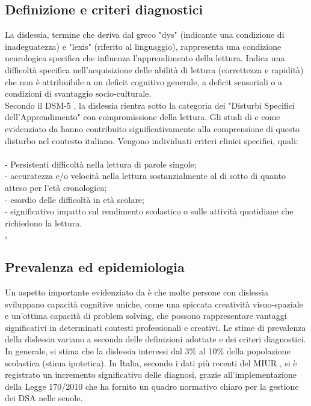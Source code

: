 \documentclass[14pt]{extbook}
\begin{document}
\subsection{Definizione e criteri diagnostici}
La dislessia, termine che deriva dal greco "dys" (indicante una condizione di inadeguatezza) e "lexis" (riferito al linguaggio), rappresenta una condizione neurologica specifica che influenza l'apprendimento della lettura. Indica una difficoltà specifica nell’acquisizione delle abilità di lettura (correttezza e rapidità) che non è attribuibile a un deficit cognitivo generale, a deficit sensoriali o a condizioni di svantaggio socio-culturale.\\

Secondo il DSM-5 \cite{apa2013dsm}, la dislessia rientra sotto la categoria dei "Disturbi Specifici dell'Apprendimento" con compromissione della lettura. Gli studi di \cite{stella2011dislessia} e come evidenziato da \cite{cornoldi2016reading} hanno contribuito significativamente alla comprensione di questo disturbo nel contesto italiano. Vengono individuati criteri clinici specifici, quali:\\\\

\noindent- Persistenti difficoltà nella lettura di parole singole;\\
- accuratezza e/o velocità nella lettura sostanzialmente al di sotto di quanto atteso per l’età cronologica;\\
- esordio delle difficoltà in età scolare;\\
- significativo impatto sul rendimento scolastico o sulle attività quotidiane che richiedono la lettura.\\

\cite{apa2013dsm}, \cite{ida2024understanding}

\subsection{Prevalenza ed epidemiologia}
Un aspetto importante evidenziato da \cite{eide2011advantage} è che molte persone con dislessia sviluppano capacità cognitive uniche, come una spiccata creatività visuo-spaziale e un'ottima capacità di problem solving, che possono rappresentare vantaggi significativi in determinati contesti professionali e creativi. Le stime di prevalenza della dislessia variano a seconda delle definizioni adottate e dei criteri diagnostici. In generale, si stima che la dislessia interessi dal 3\% al 10\% della popolazione scolastica (stima ipotetica). In Italia, secondo i dati più recenti del MIUR \cite{miur2024dsa}, si è registrato un incremento significativo delle diagnosi, grazie all'implementazione della Legge 170/2010 \cite{legge170_2010} che ha fornito un quadro normativo chiaro per la gestione dei DSA nelle scuole.\\\\
\end{document}
